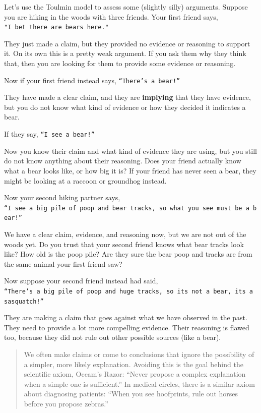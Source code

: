 \documentclass[
]{book}
\begin{document}
Let's use the Toulmin model to assess some (slightly silly) arguments. Suppose you are hiking in the woods with three friends. Your first friend says,
\texttt{"I\ bet\ there\ are\ bears\ here."}

They just made a claim, but they provided no evidence or reasoning to support it. On its own this is a pretty weak argument. If you ask them why they think that, then you are looking for them to provide some evidence or reasoning.

Now if your first friend instead says,
\texttt{“There’s\ a\ bear!”}

They have made a clear claim, and they are \textbf{implying} that they have evidence, but you do not know what kind of evidence or how they decided it indicates a bear.

If they say,
\texttt{“I\ see\ a\ bear!”}

Now you know their claim and what kind of evidence they are using, but you still do not know anything about their reasoning. Does your friend actually know what a bear looks like, or how big it is? If your friend has never seen a bear, they might be looking at a raccoon or groundhog instead.

Now your second hiking partner says,
\texttt{“I\ see\ a\ big\ pile\ of\ poop\ and\ bear\ tracks,\ so\ what\ you\ see\ must\ be\ a\ bear!”}

We have a clear claim, evidence, and reasoning now, but we are not out of the woods yet. Do you trust that your second friend knows what bear tracks look like? How old is the poop pile? Are they sure the bear poop and tracks are from the same animal your first friend saw?

Now suppose your second friend instead had said,
\texttt{“There’s\ a\ big\ pile\ of\ poop\ and\ huge\ tracks,\ so\ it\textquotesingle{}s\ not\ a\ bear,\ it\textquotesingle{}s\ a\ sasquatch!”}

They are making a claim that goes against what we have observed in the past. They need to provide a lot more compelling evidence. Their reasoning is flawed too, because they did not rule out other possible sources (like a bear).

\begin{quote}
We often make claims or come to conclusions that ignore the possibility of a simpler, more likely explanation. Avoiding this is the goal behind the scientific axiom, Occam's Razor: ``Never propose a complex explanation when a simple one is sufficient.'' In medical circles, there is a similar axiom about diagnosing patients: ``When you see hoofprints, rule out horses before you propose zebras.''
\end{quote}
\end{document}
